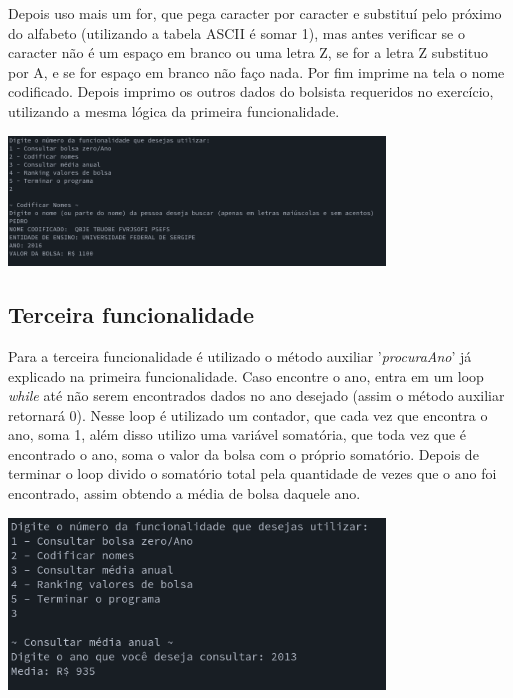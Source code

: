 \documentclass[11pt]{article}
\begin{document}
Depois uso mais um for, que pega caracter por caracter e substituí pelo próximo do alfabeto (utilizando a tabela ASCII é somar 1), mas antes verificar se o caracter não é um espaço em branco ou uma letra Z, se for a letra Z substituo por A, e se for espaço em branco não faço nada. Por fim imprime na tela o nome codificado. Depois imprimo os outros dados do bolsista requeridos no exercício, utilizando a mesma lógica da primeira funcionalidade.

\includegraphics[width=10cm]{func2.png}

\subsection{Terceira funcionalidade}
\label{sec:orga96aa12}
Para a terceira funcionalidade é utilizado o método auxiliar '\emph{procuraAno}' já explicado na primeira funcionalidade. Caso encontre o ano, entra em um loop \emph{while} até não serem encontrados dados no ano desejado (assim o método auxiliar retornará 0). Nesse loop é utilizado um contador, que cada vez que encontra o ano, soma 1, além disso utilizo uma variável somatória, que toda vez que é encontrado o ano, soma o valor da bolsa com o próprio somatório. Depois de terminar o loop divido o somatório total pela quantidade de vezes que o ano foi encontrado, assim obtendo a média de bolsa daquele ano.

\includegraphics[width=10cm]{func3.png}
\end{document}

